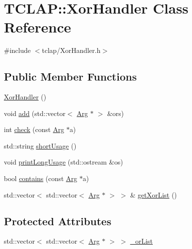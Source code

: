 \hypertarget{class_t_c_l_a_p_1_1_xor_handler}{}\section{T\+C\+L\+A\+P\+:\+:Xor\+Handler Class Reference}
\label{class_t_c_l_a_p_1_1_xor_handler}


{\ttfamily \#include $<$tclap/\+Xor\+Handler.\+h$>$}

\subsection*{Public Member Functions}
\begin{DoxyCompactItemize}
\item 
\hyperlink{class_t_c_l_a_p_1_1_xor_handler_a195391f50b7fe5eb939c2f6d236f571e}{Xor\+Handler} ()
\item 
void \hyperlink{class_t_c_l_a_p_1_1_xor_handler_a76f156bf36a8aede334801aa242f31b9}{add} (std\+::vector$<$ \hyperlink{class_t_c_l_a_p_1_1_arg}{Arg} $\ast$ $>$ \&ors)
\item 
int \hyperlink{class_t_c_l_a_p_1_1_xor_handler_a3df7722e4c4c5d331de69fc902336b00}{check} (const \hyperlink{class_t_c_l_a_p_1_1_arg}{Arg} $\ast$a)
\item 
std\+::string \hyperlink{class_t_c_l_a_p_1_1_xor_handler_aca185a80e9df6e4250a230fa5aec7891}{short\+Usage} ()
\item 
void \hyperlink{class_t_c_l_a_p_1_1_xor_handler_a257a855934eb343a0fad3c4e5fe5ff57}{print\+Long\+Usage} (std\+::ostream \&os)
\item 
bool \hyperlink{class_t_c_l_a_p_1_1_xor_handler_a1a74fab4667cc591a1e3094c91bc942d}{contains} (const \hyperlink{class_t_c_l_a_p_1_1_arg}{Arg} $\ast$a)
\item 
std\+::vector$<$ std\+::vector$<$ \hyperlink{class_t_c_l_a_p_1_1_arg}{Arg} $\ast$ $>$ $>$ \& \hyperlink{class_t_c_l_a_p_1_1_xor_handler_a0e0d95c697d227cc51f82424b8530182}{get\+Xor\+List} ()
\end{DoxyCompactItemize}
\subsection*{Protected Attributes}
\begin{DoxyCompactItemize}
\item 
std\+::vector$<$ std\+::vector$<$ \hyperlink{class_t_c_l_a_p_1_1_arg}{Arg} $\ast$ $>$ $>$ \hyperlink{class_t_c_l_a_p_1_1_xor_handler_a4ebd5b96e23a0ab03bdd431fe622d4e1}{\+\_\+or\+List}
\end{DoxyCompactItemize}


